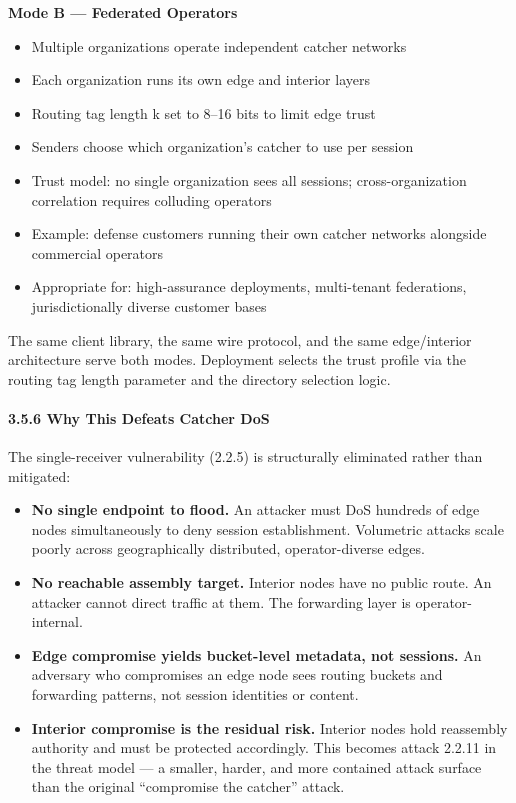 \documentclass[
  11pt,
]{article}
\providecommand{\tightlist}{%
  \setlength{\itemsep}{0pt}\setlength{\parskip}{0pt}}
\begin{document}
\textbf{Mode B --- Federated Operators}

\begin{itemize}
\tightlist
\item
  Multiple organizations operate independent catcher networks
\item
  Each organization runs its own edge and interior layers
\item
  Routing tag length k set to 8--16 bits to limit edge trust
\item
  Senders choose which organization's catcher to use per session
\item
  Trust model: no single organization sees all sessions;
  cross-organization correlation requires colluding operators
\item
  Example: defense customers running their own catcher networks
  alongside commercial operators
\item
  Appropriate for: high-assurance deployments, multi-tenant federations,
  jurisdictionally diverse customer bases
\end{itemize}

The same client library, the same wire protocol, and the same
edge/interior architecture serve both modes. Deployment selects the
trust profile via the routing tag length parameter and the directory
selection logic.

\hypertarget{why-this-defeats-catcher-dos}{%
\paragraph{3.5.6 Why This Defeats Catcher
DoS}\label{why-this-defeats-catcher-dos}}

The single-receiver vulnerability (2.2.5) is structurally eliminated
rather than mitigated:

\begin{itemize}
\tightlist
\item
  \textbf{No single endpoint to flood.} An attacker must DoS hundreds of
  edge nodes simultaneously to deny session establishment. Volumetric
  attacks scale poorly across geographically distributed,
  operator-diverse edges.
\item
  \textbf{No reachable assembly target.} Interior nodes have no public
  route. An attacker cannot direct traffic at them. The forwarding layer
  is operator-internal.
\item
  \textbf{Edge compromise yields bucket-level metadata, not sessions.}
  An adversary who compromises an edge node sees routing buckets and
  forwarding patterns, not session identities or content.
\item
  \textbf{Interior compromise is the residual risk.} Interior nodes hold
  reassembly authority and must be protected accordingly. This becomes
  attack 2.2.11 in the threat model --- a smaller, harder, and more
  contained attack surface than the original ``compromise the catcher''
  attack.
\end{itemize}
\end{document}
